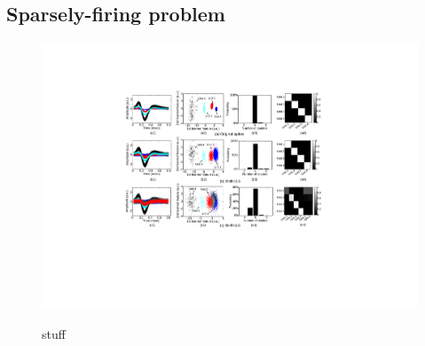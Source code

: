 \documentclass[journal]{IEEEtran}
\begin{document}
\subsection {Sparsely-firing problem}

\begin{figure}[!htbp]
\centering

   \includegraphics[width=1.0\linewidth,angle=0] {figs_new/sparse_firing.pdf}
   \label{fig:Sparse_firing_neuron}
  \caption{stuff}
\end{figure}
\end{document}
